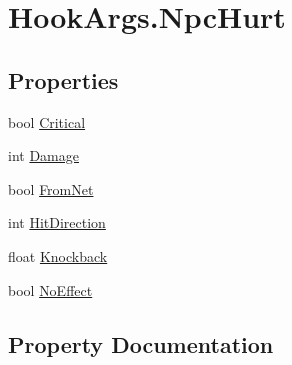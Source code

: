 \hypertarget{structOTA_1_1Plugin_1_1HookArgs_1_1NpcHurt}{}\section{Hook\+Args.\+Npc\+Hurt}
\label{structOTA_1_1Plugin_1_1HookArgs_1_1NpcHurt}
\subsection*{Properties}
\begin{DoxyCompactItemize}
\item 
bool \hyperlink{structOTA_1_1Plugin_1_1HookArgs_1_1NpcHurt_ad129630f5a0296046dce8ea5f79f5629}{Critical}
\item 
int \hyperlink{structOTA_1_1Plugin_1_1HookArgs_1_1NpcHurt_ab16a3ebb727a38f50223c1be2ecd111d}{Damage}
\item 
bool \hyperlink{structOTA_1_1Plugin_1_1HookArgs_1_1NpcHurt_a34d079c227425837eefec2fdc4372b80}{From\+Net}
\item 
int \hyperlink{structOTA_1_1Plugin_1_1HookArgs_1_1NpcHurt_a4278e690a1a75136e8ebce3224d47a60}{Hit\+Direction}
\item 
float \hyperlink{structOTA_1_1Plugin_1_1HookArgs_1_1NpcHurt_ad22d30a3970ffaf441871a8c7cb6c1f5}{Knockback}
\item 
bool \hyperlink{structOTA_1_1Plugin_1_1HookArgs_1_1NpcHurt_abff76c9fa8b92317d41a90afe2d4c368}{No\+Effect}
\end{DoxyCompactItemize}


\subsection{Property Documentation}
\hypertarget{structOTA_1_1Plugin_1_1HookArgs_1_1NpcHurt_ad129630f5a0296046dce8ea5f79f5629}{}
